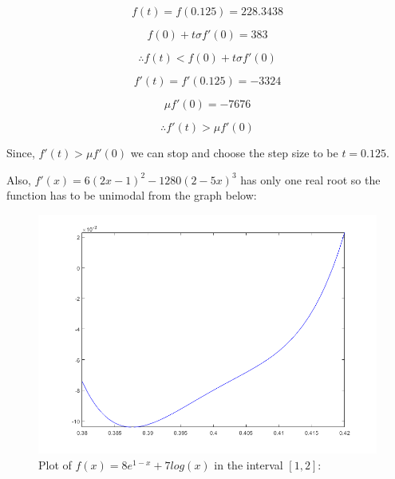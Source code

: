 \documentclass[a4paper]{article}
\begin{document}
\begin{equation}
f(t) = f(0.125) = 228.3438
\end{equation}

\begin{equation}
f(0) + t{\sigma}f'(0) = 383
\end{equation}

\begin{equation}
\therefore f(t) < f(0) + t{\sigma}f'(0)
\end{equation}

\begin{equation}
f'(t) = f'(0.125) = -3324
\end{equation}

\begin{equation}
{\mu}f'(0) = -7676
\end{equation}

\begin{equation}
\therefore f'(t) > {\mu}f'(0)
\end{equation}

Since, $f'(t) > {\mu}f'(0)$  we can stop and choose the step size to be $t = 0.125$. 

Also, $f'(x) = 6(2x - 1)^2  - 1280(2 - 5x)^3$  has only one real root so the function has to be unimodal from the graph below:

\begin{figure}[!htbp]
\begin{center}
\includegraphics[scale=0.75]{problem-3.png}
\end{center}
\caption{Plot of $f(x) = 8e^{1 -x} + 7log(x)$ in the interval $[1, 2]$:}\label{exampleplot}
\end{figure}
\end{document}
